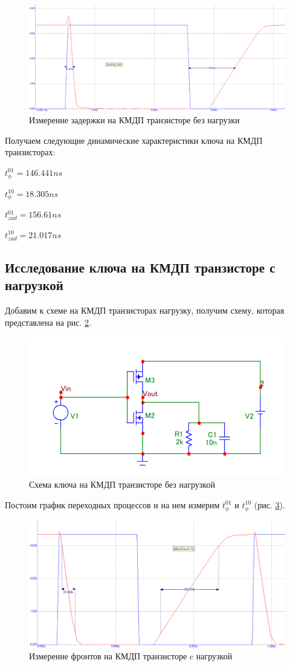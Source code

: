 \documentclass[a4paper,14pt]{article}
\begin{document}
\begin{figure}[H]
	\centering
	\includegraphics[width=0.7\linewidth]{image/KMDP_graf_zad}
	\caption{Измерение задержки на КМДП транзисторе без нагрузки}
	\label{fig:kmdpgrafzad}
\end{figure}

Получаем следующие динамические характеристики ключа на КМДП транзисторах:

$t^{01}_{\phi} = 146.441ns$

$t^{10}_{\phi} = 18.305ns$

$t^{01}_{zad} = 156.61ns$

$t^{10}_{zad} = 21.017ns$



\subsection{Исследование ключа на КМДП транзисторе с нагрузкой}

Добавим к схеме на КМДП транзисторах нагрузку, получим схему, которая представлена на рис. \ref{fig:kmdpshnagr}.

\begin{figure}[H]
	\centering
	\includegraphics[width=0.7\linewidth]{image/KMDP_sh_nagr}
	\caption{Схема ключа на КМДП транзисторе без нагрузкой}
	\label{fig:kmdpshnagr}
\end{figure}

Постоим график переходных процессов и на нем измерим $t^{01}_{\phi}$ и $t^{10}_{\phi}$ (рис.  \ref{fig:kmdpgraffrnagr}).

\begin{figure}[H]
	\centering
	\includegraphics[width=0.7\linewidth]{image/KMDP_graf_fr_nagr}
	\caption{Измерение фронтов на КМДП транзисторе c нагрузкой}
	\label{fig:kmdpgraffrnagr}
\end{figure}
\end{document}
